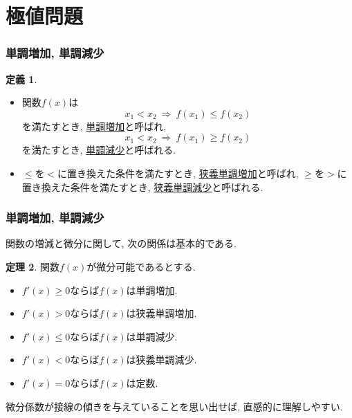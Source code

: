 \documentclass[dvipdfmx,cjk,10.2pt]{beamer}
\theoremstyle{definition}
\newtheorem{Thm}{定理}[section]
\newtheorem{Def}[Thm]{定義}
\begin{document}

\section{極値問題}



\begin{frame}
\frametitle{単調増加, 単調減少}


\begin{Def}
\begin{itemize}
\item 関数$f(x)$は
$$
x_1 < x_2 \ \Rightarrow \ f(x_1)  \le f(x_2)
$$
を満たすとき, \underline{単調増加}と呼ばれ, 
$$
x_1 < x_2 \ \Rightarrow \ f(x_1)  \ge f(x_2)
$$
を満たすとき, \underline{単調減少}と呼ばれる. 
\item $\le$を$<$に置き換えた条件を満たすとき, \underline{狭義単調増加}と呼ばれ, 
$\ge$を$>$に置き換えた条件を満たすとき, \underline{狭義単調減少}と呼ばれる. 
\end{itemize}
\end{Def}




\end{frame}





\begin{frame}
\frametitle{単調増加, 単調減少}


関数の増減と微分に関して, 次の関係は基本的である. 

\begin{Thm}
関数$f(x)$が微分可能であるとする. 
\begin{itemize}
\item $f'(x)\ge0$ならば$f(x)$は単調増加. 
\item $f'(x)>0$ならば$f(x)$は狭義単調増加. 
\item $f'(x)\le0$ならば$f(x)$は単調減少. 
\item $f'(x)<0$ならば$f(x)$は狭義単調減少. 
\item $f'(x)=0$ならば$f(x)$は定数. 
\end{itemize}
\end{Thm}
微分係数が接線の傾きを与えていることを思い出せば, 直感的に理解しやすい. 


\end{frame}
\end{document}
